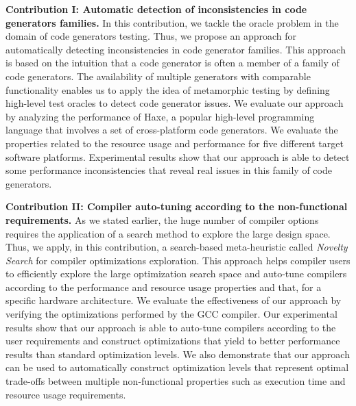 \textbf{Contribution I: Automatic detection of inconsistencies in code generators families.}
In this contribution, we tackle the oracle problem in the domain of code generators testing. Thus, we propose an approach for automatically detecting inconsistencies in code generator families.
This approach is based on the intuition that a code generator is often a member of a family of code generators. The availability of multiple generators with comparable functionality enables us to apply the idea of metamorphic testing\cite{zhou2004metamorphic} by defining high-level test oracles to detect code generator issues.
We evaluate our approach by analyzing the performance of Haxe, a popular high-level programming language that involves a set of cross-platform code generators. We evaluate the properties related to the resource usage and performance for five different target software platforms. Experimental results show that our approach is able to detect some performance inconsistencies that reveal real issues in this family of code generators.

\textbf{Contribution II: Compiler auto-tuning according to the non-functional requirements.}
As we stated earlier, the huge number of compiler options requires the application of a search method to explore the large design space. Thus, we apply, in this contribution, a search-based meta-heuristic called \textit{Novelty Search} \cite{lehman2008exploiting} for compiler optimizations exploration. This approach helps compiler users to efficiently explore the large optimization search space and auto-tune compilers according to the performance and resource usage properties and that, for a specific hardware architecture. 
We evaluate the effectiveness of our approach by verifying the optimizations performed by the GCC compiler.
Our experimental results show that our approach is able to auto-tune compilers according to the user requirements and construct optimizations that yield to better performance results than standard optimization levels. We also demonstrate that our approach can be used to automatically construct optimization levels that represent optimal trade-offs between multiple non-functional properties such as execution time and resource usage requirements.

